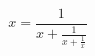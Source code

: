 \documentclass{article}
\begin{document}
{\huge

\[
  x = \frac{1}{x + \frac{1}{x + \frac{1}{x}}}
\]


}
\end{document}
